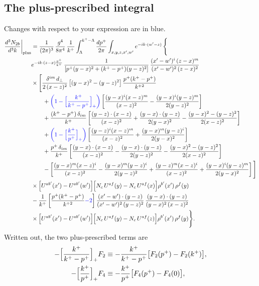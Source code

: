 \documentclass[10pt]{article}
\newcommand{\new}[1]{{\color{blue}#1}}
\begin{document}
\subsection{The plus-prescribed integral}
Changes with respect to your expression are in blue.
\begin{align}
\frac{d^{3}N_{2b}}{d^{3}k}\bigg|_{\rm plus} & = \frac{1}{(2\pi)^{3}}\,\frac{g^{4}}{8\pi^{4}}\,\frac{1}{k^{+}}\int_{\Lambda}^{k^{+}-\Lambda}\frac{dp^{+}}{2\pi}\int_{x,y,z,x',w'}e^{-ik\cdot(w'-z)}\,\Bigg\{\notag\\
&e^{-ik\cdot(z-x)\frac{p^{+}}{k^{+}}}\,\frac{1}{\left[p^{+}(y-x)^{2}+(k^{+}-p^{+})(y-z)^{2}\right]}\,\frac{(x'-w')^{i}\,(z-x)^{m}}{(x'-w')^{2}\,(z-x)^{2}}\notag\\
&\times\Bigg[\frac{\delta^{im}\,d_{\perp}}{2\,(x-z)^{2}}\left[(y-x)^{2}-(y-z)^{2}\right]\frac{p^{+}(k^{+}-p^{+})}{k^{+2}}\notag\\
&\qquad+\new{\bigg(1-\Big[\frac{k^{+}}{k^{+}-p^{+}}\Big]_{+}\bigg)}\left[\frac{(y-x)^{i}(x-z)^{m}}{(x-z)^{2}}-\frac{(y-x)^{i}(y-z)^{m}}{2(y-z)^{2}}\right]\notag\\
&\qquad+\frac{(k^{+}-p^{+})\,\delta_{im}}{k^{+}}\left[\frac{(y-z)\cdot(x-z)}{(x-z)^{2}}+\frac{(y-x)\cdot(y-z)}{2(y-x)^{2}}-\frac{(y-x)^{2}-(y-z)^{2}}{2(x-z)^{2}}\right]\notag\\
&\qquad+\new{\bigg(1-\Big[\frac{k^{+}}{p^{+}}\Big]_{+}\bigg)}\left[\frac{(y-z)^{i}(x-z)^{m}}{(x-z)^{2}}+\frac{(y-x)^{m}(y-z)^{i}}{2(y-x)^{2}}\right]\notag\\
&\qquad+\frac{p^{+}\,\delta_{im}}{k^{+}}\left[\frac{(y-x)\cdot(x-z)}{(x-z)^{2}}-\frac{(y-x)\cdot(y-z)}{2(y-z)^{2}}-\frac{(y-x)^{2}-(y-z)^{2}}{2(x-z)^{2}}\right]\notag\\
&\qquad-\left[\frac{(y-x)^{m}(x-z)^{i}}{(x-z)^{2}}-\frac{(y-x)^{m}(y-z)^{i}}{2(y-z)^{2}}+\frac{(y-z)^{m}(x-z)^{i}}{(x-z)^{2}}+\frac{(y-x)^{i}(y-z)^{m}}{2(y-x)^{2}}\right]\Bigg]\notag\\
&\times\Big[U^{ab'}(x')-U^{ab'}(w')\Big]\Big[N_{c}\,U^{af}(y)-N_{c}\,U^{af}(x)\Big]\rho^{b'}(x')\,\rho^{f}(y)\notag\\
&-\frac{1}{k^{+}}\left[\frac{p^{+}(k^{+}-p^{+})}{k^{+2}}\new{-2}\right]
\frac{(x'-w')\cdot(y-z)}{(x'-w')^{2}\,(y-z)^{2}}\,\frac{(y-x)\cdot(y-z)}{(y-x)^{2}\,(x-z)^{2}}\notag\\
&\times\Big[U^{ab'}(x')-U^{ab'}(w')\Big]\Big[N_{c}\,U^{af}(y)-N_{c}\,U^{af}(z)\Big]\rho^{b'}(x')\,\rho^{f}(y)\Bigg\}.
\label{eq:plus}
\end{align}
Written out, the two plus-prescribed terms are
\begin{align}
-\Big[\frac{k^{+}}{k^{+}-p^{+}}\Big]_{+}F_2&\equiv-\frac{k^+}{k^+-p^+}\big[F_2(p^+)-F_2(k^+)\big],\notag\\
-\Big[\frac{k^{+}}{p^{+}}\Big]_{+}F_4&\equiv-\frac{k^+}{p^+}\big[F_4(p^+)-F_4(0)\big],
\end{align}
\end{document}
